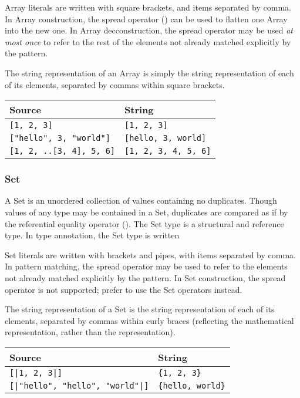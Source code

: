 Array literals are written with square brackets, and items separated by
comma. In Array construction, the spread operator () can be used
to flatten one Array into the new one. In Array decconstruction, the spread
operator may be used \emph{at most once} to refer to the rest of the elements
not already matched explicitly by the pattern.

The string representation of an Array is simply the string representation of
each of its elements, separated by commas within square brackets.

\begin{table}[H]
    \centering
    \begin{tabular}{ll}
        \hline
        \textbf{Source} & \textbf{String} \\
        \hline
        \texttt{[1, 2, 3]} & \texttt{[1, 2, 3]} \\
        \texttt{["hello", 3, "world"]} & \texttt{[hello, 3, world]} \\
        \texttt{[1, 2, ..[3, 4], 5, 6]} & \texttt{[1, 2, 3, 4, 5, 6]} \\
        \hline
    \end{tabular}
\end{table}

\subsubsection{Set}

A Set is an unordered collection of values containing no duplicates. Though
values of any type may be contained in a Set, duplicates are compared as if
by the referential equality operator (). The Set type is a structural
and reference type. In type annotation, the Set type is written 

Set literals are written with brackets and pipes, with items separated by comma.
In pattern matching, the spread operator may be used to refer to the elements
not already matched explicitly by the pattern. In Set construction, the
spread operator is not supported; prefer to use the Set operators instead.

The string representation of a Set is the string representation of
each of its elements, separated by commas within curly braces (reflecting the
mathematical representation, rather than the \Trilogy{} representation).

\begin{table}[H]
    \centering
    \begin{tabular}{ll}
        \hline
        \textbf{Source} & \textbf{String} \\
        \hline
        \texttt{[|1, 2, 3|]} & \texttt{\{1, 2, 3\}} \\
        \texttt{[|"hello", "hello", "world"|]} & \texttt{\{hello, world\}} \\
        \hline
    \end{tabular}
\end{table}

